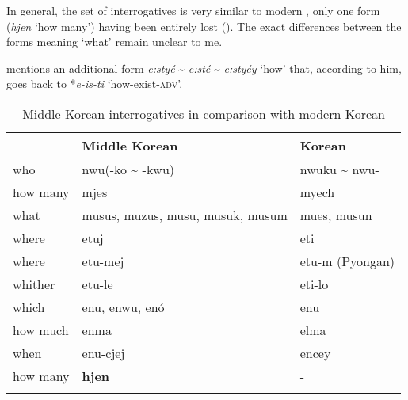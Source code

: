 In general, the set of  interrogatives is very similar to modern , only one form (\textit{hjen} ‘how many’) having been entirely lost (). The exact differences between the forms meaning ‘what’ remain unclear to me.

\citet[319]{Vovin2005} mentions an additional  form \textit{e:styé} {\textasciitilde} \textit{e:sté} {\textasciitilde} \textit{e:styéy} ‘how’ that, according to him, goes back to *\textit{e-is-ti} ‘how-exist-\textsc{adv}’.

\newpage %

\begin{table}[t]
\caption{Middle Korean interrogatives \citep[98]{Sohn2015} in comparison with modern Korean}
\label{tab:kore:12}
\begin{tabularx}{\textwidth}{Xll}
\lsptoprule
& \textbf{Middle Korean} & \textbf{Korean}\\
\midrule
who & nwu(-ko {\textasciitilde} -kwu) & nwuku {\textasciitilde} nwu-\\
how many & mjes & myech\\
what & musus, muzus, musu, musuk, musum & mues, musun\\
where & etuj & eti\\
where & etu-mej & etu-m (Pyongan)\\
whither & etu-le & eti-lo\\
which & enu, enwu, enó & enu\\
how much & enma & elma\\
when & enu-cjej & encey\\
how many & \textbf{hjen} & -\\
\lspbottomrule
\end{tabularx}
\end{table}
